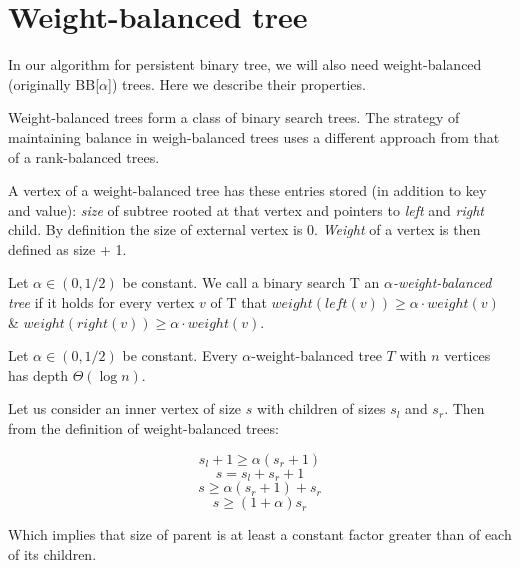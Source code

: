 \section{Weight-balanced tree}

In our algorithm for persistent binary tree, we will also need weight-balanced (originally BB[$\alpha$]) trees. Here we describe their properties.

Weight-balanced trees form a class of binary search trees. The strategy of maintaining balance in weigh-balanced trees uses a different approach from that of a rank-balanced trees.

A vertex of a weight-balanced tree has these entries stored (in addition to key and value): {\em size} of subtree rooted at that vertex and pointers to {\em left} and {\em right} child. By definition the size of external vertex is 0. {\em Weight} of a vertex is then defined as size + 1.

\begin{defn}
Let $\alpha \in (0,1/2)$ be constant. We call a binary search T an {\em $\alpha$-weight-balanced tree} if it holds for every vertex $v$ of T that $weight(left(v)) \geq \alpha \cdot weight(v)$ \& $weight(right(v)) \geq \alpha \cdot weight(v) $.
\end{defn}

\begin{prop}
Let $\alpha \in (0,1/2)$ be constant. Every $\alpha$-weight-balanced tree $T$ with $n$ vertices has depth $\Theta(\log n)$. 
\end{prop}

\begin{myproof}
Let us consider an inner vertex of size $s$ with children of sizes $s_l$ and $s_r$. Then from the definition of weight-balanced trees:

$$s_l + 1 \geq \alpha (s_r+1)$$
$$ s = s_l + s_r + 1 $$
$$ s \geq \alpha (s_r+1) + s_r $$
$$ s \geq (1+\alpha)s_r $$

Which implies that size of parent is at least a constant factor greater than of each of its children.
\end{myproof}